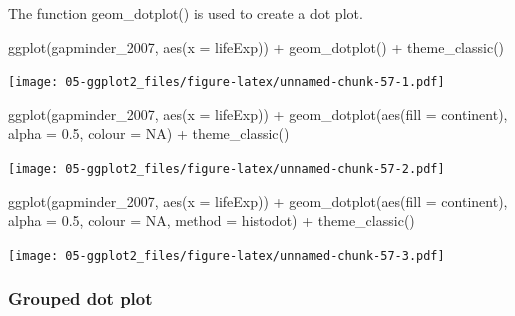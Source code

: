 \documentclass[
]{book}
\newenvironment{Shaded}{\begin{snugshade}}{\end{snugshade}}
\newcommand{\AttributeTok}[1]{\textcolor[rgb]{0.77,0.63,0.00}{#1}}
\newcommand{\ConstantTok}[1]{\textcolor[rgb]{0.00,0.00,0.00}{#1}}
\newcommand{\FloatTok}[1]{\textcolor[rgb]{0.00,0.00,0.81}{#1}}
\newcommand{\FunctionTok}[1]{\textcolor[rgb]{0.00,0.00,0.00}{#1}}
\newcommand{\NormalTok}[1]{#1}
\newcommand{\SpecialCharTok}[1]{\textcolor[rgb]{0.00,0.00,0.00}{#1}}
\newcommand{\StringTok}[1]{\textcolor[rgb]{0.31,0.60,0.02}{#1}}
\begin{document}
The function geom\_dotplot() is used to create a dot plot.

\begin{Shaded}
\begin{Highlighting}[]
\FunctionTok{ggplot}\NormalTok{(gapminder\_2007, }\FunctionTok{aes}\NormalTok{(}\AttributeTok{x =}\NormalTok{ lifeExp)) }\SpecialCharTok{+}
   \FunctionTok{geom\_dotplot}\NormalTok{() }\SpecialCharTok{+}
   \FunctionTok{theme\_classic}\NormalTok{()}
\end{Highlighting}
\end{Shaded}

\texttt{[image: 05-ggplot2\_files/figure-latex/unnamed-chunk-57-1.pdf]}

\begin{Shaded}
\begin{Highlighting}[]


\FunctionTok{ggplot}\NormalTok{(gapminder\_2007, }\FunctionTok{aes}\NormalTok{(}\AttributeTok{x =}\NormalTok{ lifeExp)) }\SpecialCharTok{+}
   \FunctionTok{geom\_dotplot}\NormalTok{(}\FunctionTok{aes}\NormalTok{(}\AttributeTok{fill =}\NormalTok{ continent), }\AttributeTok{alpha =} \FloatTok{0.5}\NormalTok{, }\AttributeTok{colour =} \ConstantTok{NA}\NormalTok{) }\SpecialCharTok{+}
   \FunctionTok{theme\_classic}\NormalTok{()}
\end{Highlighting}
\end{Shaded}

\texttt{[image: 05-ggplot2\_files/figure-latex/unnamed-chunk-57-2.pdf]}

\begin{Shaded}
\begin{Highlighting}[]


\FunctionTok{ggplot}\NormalTok{(gapminder\_2007, }\FunctionTok{aes}\NormalTok{(}\AttributeTok{x =}\NormalTok{ lifeExp)) }\SpecialCharTok{+}
   \FunctionTok{geom\_dotplot}\NormalTok{(}\FunctionTok{aes}\NormalTok{(}\AttributeTok{fill =}\NormalTok{ continent), }\AttributeTok{alpha =} \FloatTok{0.5}\NormalTok{, }\AttributeTok{colour =} \ConstantTok{NA}\NormalTok{, }\AttributeTok{method =} \StringTok{\textquotesingle{}histodot\textquotesingle{}}\NormalTok{) }\SpecialCharTok{+}
   \FunctionTok{theme\_classic}\NormalTok{()}
\end{Highlighting}
\end{Shaded}

\texttt{[image: 05-ggplot2\_files/figure-latex/unnamed-chunk-57-3.pdf]}

\hypertarget{grouped-dot-plot}{%
\subsubsection{Grouped dot plot}\label{grouped-dot-plot}}
\end{document}

